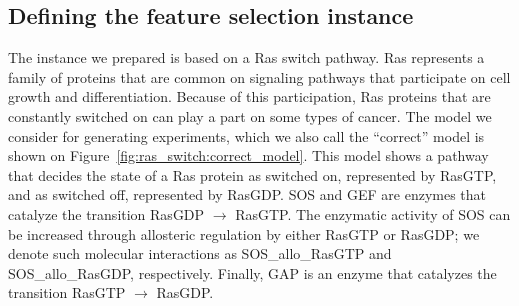 \subsection{Defining the feature selection instance}


% 

The instance we prepared is based on a Ras switch pathway. Ras
represents a family of proteins that are common on signaling pathways
that participate on cell growth and differentiation. Because of this
participation, Ras proteins that are constantly switched on can play a 
part on some types of cancer. The model we consider for generating 
experiments, which we also call the ``correct'' model is shown on 
Figure~\ref{fig:ras_switch:correct_model}. This model shows a pathway
that decides the state of a Ras protein as switched on, represented by
RasGTP, and as switched off, represented by RasGDP. SOS and GEF are enzymes that catalyze the transition RasGDP $\rightarrow$ RasGTP. The enzymatic activity of SOS can be increased through allosteric regulation by either RasGTP or RasGDP; we denote such molecular interactions as SOS\_allo\_RasGTP and SOS\_allo\_RasGDP, respectively. Finally, GAP is an enzyme that catalyzes the transition RasGTP $\rightarrow$ RasGDP.


